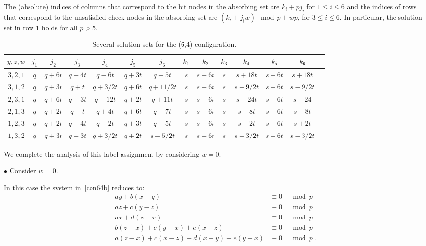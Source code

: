 {The (absolute) indices of columns that correspond to the bit nodes
in the absorbing set are $k_i+pj_i$ for $1 \leq i \leq 6$ and the
indices of rows that correspond to the unsatisfied check nodes in
the absorbing set are $(k_i+j_iw) \mod p+ wp$, for $3\leq i \leq
6$. In particular, the solution set in row 1 holds for all $p >
5$.

\hspace{-0.95in}\small{\hspace{-0.95in}\begin{table}[ht]\vspace{-0.05in}\hspace{-0.95in}
\begin{tabular}{|c |c|c|c|c|c|c|c|c|c|c|c|c|c|}
  \hline
  $y,z,w$ & $j_1$ & $j_2$ & $j_3$ & $j_4$ & $j_5$ & $j_6$ & $k_1$ & $k_2$ & $k_3$ & $k_4$ & $k_5$ & $k_6$ \\
  \hline
$3,2,1$&  $q$ & $q+6t$ &  $q+4t$ &  $q-6t$ &  $q+3t$ & $q-5t$ &
$s$ & $s-6t$ & $s$ & $s+18t$ & $s-6t$ &
  $s+18t$\\
  $3,1,2$&$q$& $q+3t$ &  $q+t$ &    $q+3/2t$ &  $q+6t$ &   $q+11/2t$ & $s$ & $s-6t$ & $s$ & $s-9/2t$ & $s-6t$ &
  $s-9/2t$\\
 $2,3,1$& $q$ & $q+6t$ &  $q+3t$&    $q+12t$ &  $q+2t$ &   $q+11t$ & $s$ & $s-6t$ & $s$ & $s-24t$ & $s-6t$ &
  $s-24$\\
$2,1,3$&  $q$ & $q+2t$ &  $q-t$ &  $q+4t$ &   $q+6t$ &    $q+7t$ &
$s$ & $s-6t$ & $s$ & $s-8t$ & $s-6t$ &
  $s-8t$\\
 $1,2,3$& $q$ & $q+2t$ &  $q-4t$ &    $q-2t$ &    $q+3t$ &    $q-5t$ & $s$ & $s-6t$ & $s$ & $s+2t$ & $s-6t$ &
  $s+2t$\\
  $1,3,2$&$q$ & $q+3t$ &  $q-3t$ &    $q+3/2t$ &  $q+2t$ &   $q-5/2t$ & $s$ & $s-6t$ & $s$ & $s-3/2t$ & $s-6t$ &
  $s-3/2t$\\
  \hline
\end{tabular}
\caption{ Several solution sets for the (6,4)
configuration.}\label{table64}
\end{table}}
\normalsize }

We complete the analysis of this label assignment by considering
$w=0$.

$\bullet$ Consider $w=0$.



In this case the system in~\eqref{con64b} reduces to:
 \begin{equation}\label{sys31a}\begin{array}{ccccc}
 ay+b(x-y) &\equiv 0 &\mod p\\
 az+c(y-z)  &\equiv 0 &\mod p\\
 ax+d(z-x) &\equiv 0 &\mod p\\
 b(z-x)+c(y-x)+e(x-z) &\equiv 0 &\mod p\\
 a(z-x)+c(x-z)+d(x-y)+e(y-x) &\equiv 0 &\mod p~.
 \end{array}
 \end{equation}


